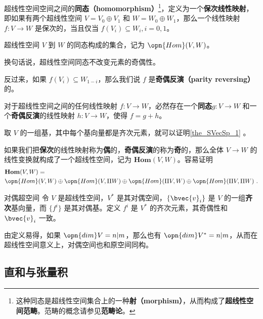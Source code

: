 超线性空间空间之间的\textbf{同态（homomorphism）}\footnote{这种同态是超线性空间集合上的一种\textbf{射（morphism）}，从而构成了\textbf{超线性空间范畴}。范畴的概念请参见\textbf{范畴论}。}，定义为一个\textbf{保次线性映射}，即如果有两个超线性空间 $V=V_0\oplus V_1$ 和 $W=W_0\oplus W_1$，那么一个线性映射 $f:V\to W$ 是保次的，当且仅当 $f(V_i)\subseteq W_i, i=0, 1$。

\begin{definition}{}
超线性空间 $V$ 到 $W$ 的同态构成的集合，记为 $\opn{Hom}(V, W)$。
\end{definition}

换句话说，超线性空间同态不改变元素的奇偶性。

反过来，如果 $f(V_i)\subseteq W_{1-i}$，那么我们说 $f$ 是\textbf{奇偶反演（parity reversing）}的。

\begin{theorem}{}\label{the_SVecSp_1}
对于超线性空间之间的任何线性映射 $f:V\to W$，必然存在一个\textbf{同态}$g:V\to W$ 和一个\textbf{奇偶反演}的线性映射 $h:V\to W$，使得 $f=g+h$。
\end{theorem}

取 $V$ 的一组基，其中每个基向量都是齐次元素，就可以证明\autoref{the_SVecSp_1} 。

如果我们把\textbf{保次}的线性映射称为\textbf{偶}的，\textbf{奇偶反演}的称为\textbf{奇}的，那么全体 $V\to W$ 的线性变换就构成了一个超线性空间，记为 $\mathbf{Hom}(V, W)$。容易证明
\begin{equation}
\begin{aligned}
&\mathbf{Hom}(V, W)=\\&\opn{Hom}(V, W)\oplus\opn{Hom}(V, \Pi W)\oplus\opn{Hom}(\Pi V, W)\oplus\opn{Hom}(\Pi V, \Pi W)~.
\end{aligned}
\end{equation}

\begin{definition}{对偶超空间}
令 $V$ 是超线性空间，$V^*$ 是其对偶空间，$\{\bvec{v}_i\}$ 是 $V$ 的一组\textbf{齐次}基向量，而 $\{f^i\}$ 是其对偶基。定义 $f^i$ 是 $V^*$ 的齐次元素，其奇偶性和 $\bvec{v}_i$ 一致。
\end{definition}

由定义易得，如果 $\opn{dim}V=n|m$，那么也有 $\opn{dim}V^*=n|m$，从而在超线性空间意义上，对偶空间也和原空间同构。


\subsection{直和与张量积}

